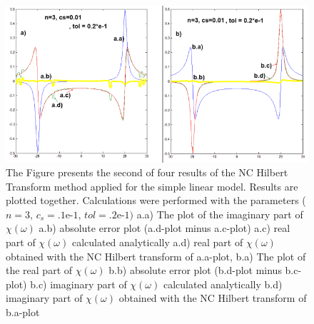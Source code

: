 \documentclass[12pt,twoside,a4paper]{article}
\numberwithin{equation}{subsection}
\numberwithin{figure}{subsection}
\begin{document}
\begin{figure}
  \includegraphics[width=150mm]{img/nc_lin2.png}
  \caption{ The Figure presents the second of four results of the NC Hilbert Transform method applied for the simple linear model.
  Results are plotted together. Calculations were performed with the parameters ($n = 3, \, c_s = \mbox{.1e-1}, \, tol = \mbox{.2e-1})$
     a.a) The plot of the imaginary part of $\chi (\omega )$
     a.b) absolute error plot (a.d-plot minus a.c-plot) 
     a.c) real part of $\chi (\omega )$ calculated analytically 
     a.d) real part of $\chi (\omega )$ obtained with the NC Hilbert transform of a.a-plot, 
     b.a) The plot of the real part of $\chi (\omega )$
     b.b) absolute error plot (b.d-plot minus b.c-plot)
     b.c) imaginary part of $\chi (\omega )$ calculated analytically 
     b.d) imaginary part of $\chi (\omega )$ obtained with the NC Hilbert transform of b.a-plot
     \label{fig:nc_lin2} 
  }
\end{figure}  
\end{document}
